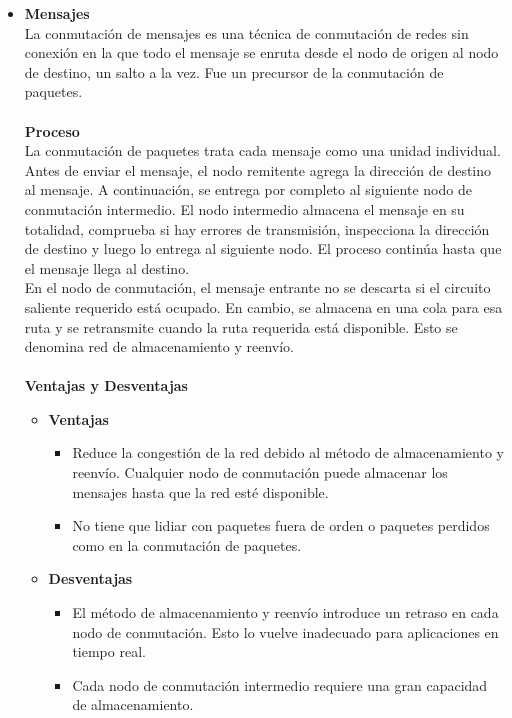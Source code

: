 \begin{itemize}
\begin{itemize}
		\item \textbf{{\color{red}Mensajes}}\\
		La conmutación de mensajes es una técnica de conmutación de redes sin conexión en la que todo el mensaje se enruta desde el nodo de origen al nodo de destino, un salto a la vez. Fue un precursor de la conmutación de paquetes.\\{ }\\ 
		\textbf{Proceso} \\
		La conmutación de paquetes trata cada mensaje como una unidad individual. Antes de enviar el mensaje, el nodo remitente agrega la dirección de destino al mensaje. A continuación, se entrega por completo al siguiente nodo de conmutación intermedio. El nodo intermedio almacena el mensaje en su totalidad, comprueba si hay errores de transmisión, inspecciona la dirección de destino y luego lo entrega al siguiente nodo. El proceso continúa hasta que el mensaje llega al destino. \\
		
		En el nodo de conmutación, el mensaje entrante no se descarta si el circuito saliente requerido está ocupado. En cambio, se almacena en una cola para esa ruta y se retransmite cuando la ruta requerida está disponible. Esto se denomina red de almacenamiento y reenvío.\\{ }\\
		\textbf{Ventajas y Desventajas}\\
		\begin{itemize}
			\item \textbf{Ventajas}
			\begin{itemize}
				\item    Reduce la congestión de la red debido al método de almacenamiento y reenvío. Cualquier nodo de conmutación puede almacenar los mensajes hasta que la red esté disponible.
				\item No tiene que lidiar con paquetes fuera de orden o paquetes perdidos como en la conmutación de paquetes.
			\end{itemize}
			\item \textbf{Desventajas}
			\begin{itemize}
				\item El método de almacenamiento y reenvío introduce un retraso en cada nodo de conmutación. Esto lo vuelve inadecuado para aplicaciones en tiempo real.
				\item Cada nodo de conmutación intermedio requiere una gran capacidad de almacenamiento.
			\end{itemize}
		\end{itemize}
		

\end{itemize}
\end{itemize}
